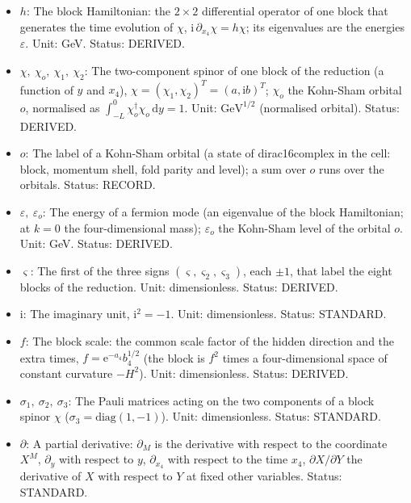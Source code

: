 \documentclass[
  10pt,
]{article}
\providecommand{\tightlist}{%
  \setlength{\itemsep}{0pt}\setlength{\parskip}{0pt}}
\begin{document}
\begin{itemize}
\tightlist
\item
  \(h\): The block Hamiltonian: the \(2 \times 2\) differential operator
  of one block that generates the time evolution of \(\chi\),
  \(\mathrm{i}\,\partial_{x_4}\chi = h\chi\); its eigenvalues are the
  energies \(\varepsilon\). Unit: GeV. Status: DERIVED.
\item
  \(\chi,\ \chi_o,\ \chi_1,\ \chi_2\): The two-component spinor of one
  block of the reduction (a function of \(y\) and \(x_4\)),
  \(\chi = (\chi_1, \chi_2)^T = (a, \mathrm{i}b)^T\); \(\chi_o\) the
  Kohn-Sham orbital \(o\), normalised as
  \(\int_{-L}^{0}\chi_o^\dagger\chi_o\,\mathrm{d}y = 1\). Unit:
  \(\mathrm{GeV}^{1/2}\) (normalised orbital). Status: DERIVED.
\item
  \(o\): The label of a Kohn-Sham orbital (a state of dirac16complex in
  the cell: block, momentum shell, fold parity and level); a sum over
  \(o\) runs over the orbitals. Status: RECORD.
\item
  \(\varepsilon,\ \varepsilon_o\): The energy of a fermion mode (an
  eigenvalue of the block Hamiltonian; at \(k = 0\) the four-dimensional
  mass); \(\varepsilon_o\) the Kohn-Sham level of the orbital \(o\).
  Unit: GeV. Status: DERIVED.
\item
  \(\varsigma\): The first of the three signs
  \((\varsigma, \varsigma_2, \varsigma_3)\), each \(\pm1\), that label
  the eight blocks of the reduction. Unit: dimensionless. Status:
  DERIVED.
\item
  \(\mathrm{i}\): The imaginary unit, \(\mathrm{i}^2 = -1\). Unit:
  dimensionless. Status: STANDARD.
\item
  \(f\): The block scale: the common scale factor of the hidden
  direction and the extra times, \(f = \mathrm{e}^{-a_4}b_4^{1/2}\) (the
  block is \(f^2\) times a four-dimensional space of constant curvature
  \(-H^2\)). Unit: dimensionless. Status: DERIVED.
\item
  \(\sigma_1,\ \sigma_2,\ \sigma_3\): The Pauli matrices acting on the
  two components of a block spinor \(\chi\)
  (\(\sigma_3 = \mathrm{diag}(1, -1)\)). Unit: dimensionless. Status:
  STANDARD.
\item
  \(\partial\): A partial derivative: \(\partial_M\) is the derivative
  with respect to the coordinate \(X^M\), \(\partial_y\) with respect to
  \(y\), \(\partial_{x_4}\) with respect to the time \(x_4\),
  \(\partial X/\partial Y\) the derivative of \(X\) with respect to
  \(Y\) at fixed other variables. Status: STANDARD.

\end{itemize}
\end{document}
